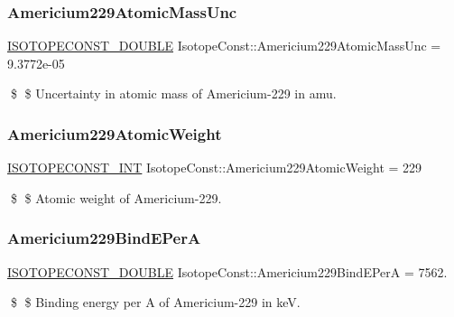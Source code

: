 \subsubsection{\texorpdfstring{Americium229\+Atomic\+Mass\+Unc}{Americium229AtomicMassUnc}}
{\footnotesize\ttfamily \mbox{\hyperlink{group___isotope_const-_macros_ga8f45a7272ce02c0b4c65c44636ed719a}{I\+S\+O\+T\+O\+P\+E\+C\+O\+N\+S\+T\+\_\+\+D\+O\+U\+B\+LE}} Isotope\+Const\+::\+Americium229\+Atomic\+Mass\+Unc = 9.\+3772e-\/05}

\$ \$ Uncertainty in atomic mass of Americium-\/229 in amu. \mbox{\label{group___isotope_const-_americium-_am229_ga3556c0acbb325ad385797be5b1e92b2f}} 
\subsubsection{\texorpdfstring{Americium229\+Atomic\+Weight}{Americium229AtomicWeight}}
{\footnotesize\ttfamily \mbox{\hyperlink{group___isotope_const-_macros_ga5f18360b3e99483a35c32d789e62621c}{I\+S\+O\+T\+O\+P\+E\+C\+O\+N\+S\+T\+\_\+\+I\+NT}} Isotope\+Const\+::\+Americium229\+Atomic\+Weight = 229}

\$ \$ Atomic weight of Americium-\/229. \mbox{\label{group___isotope_const-_americium-_am229_ga51ae936c431222627db8a5bc02c514c9}} 
\subsubsection{\texorpdfstring{Americium229\+Bind\+E\+PerA}{Americium229BindEPerA}}
{\footnotesize\ttfamily \mbox{\hyperlink{group___isotope_const-_macros_ga8f45a7272ce02c0b4c65c44636ed719a}{I\+S\+O\+T\+O\+P\+E\+C\+O\+N\+S\+T\+\_\+\+D\+O\+U\+B\+LE}} Isotope\+Const\+::\+Americium229\+Bind\+E\+PerA = 7562.}

\$ \$ Binding energy per A of Americium-\/229 in keV. \mbox{\label{group___isotope_const-_americium-_am229_gab0da4db046d8cb01a2a2d88f7bc1cfe8}} 
